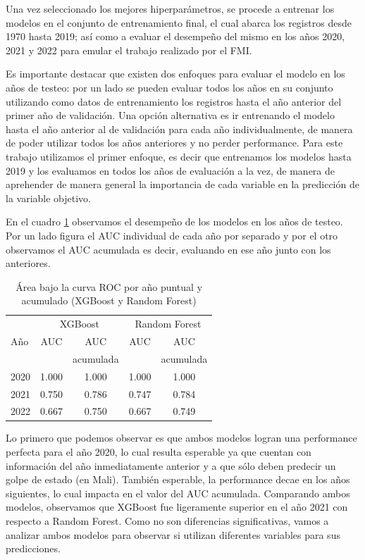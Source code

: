 \documentclass{article}
\begin{document}
Una vez seleccionado los mejores hiperparámetros, se procede a entrenar los modelos en el
conjunto de entrenamiento final, el cual abarca los registros desde 1970 hasta 2019; así
como a evaluar el desempeño del mismo en los años 2020, 2021 y 2022 para emular el trabajo
realizado por el FMI.

Es importante destacar que existen dos enfoques para evaluar el modelo en los años de
testeo: por un lado se pueden evaluar todos los años en su conjunto utilizando como datos
de entrenamiento los registros hasta el año anterior del primer año de validación. Una
opción alternativa es ir entrenando el modelo hasta el año anterior al de validación para
cada año individualmente, de manera de poder utilizar todos los años anteriores y no 
perder performance. Para este trabajo utilizamos el primer enfoque, es decir que entrenamos los 
modelos hasta 2019 y los evaluamos en todos los años de evaluación a la vez, de manera de
aprehender de manera general la importancia de cada variable en la predicción de la
variable objetivo.

En el cuadro \ref{tab:performance} observamos el desempeño de los modelos en los años
de testeo. Por un lado figura el AUC individual de cada año por separado y por el otro
observamos el AUC acumulada es decir, evaluando en ese año junto con los anteriores.

\begin{table}[H]
  \centering
    \begin{tabular}{lcccc}
      \toprule
      & \multicolumn{2}{c}{XGBoost} & \multicolumn{2}{c}{Random Forest} \\
      Año  & AUC      & AUC      & AUC      & AUC  \\
           &          & acumulada&          & acumulada \\
      \midrule
      2020 & 1.000 & 1.000 & 1.000 & 1.000 \\
      2021 & 0.750 & 0.786 & 0.747 & 0.784 \\
      2022 & 0.667 & 0.750 & 0.667 & 0.749 \\
      \bottomrule
    \end{tabular}
  \caption{Área bajo la curva ROC por año puntual y acumulado (XGBoost y 
  Random Forest) \label{tab:performance}}
\end{table}

Lo primero que podemos observar es que ambos modelos logran una performance perfecta 
para el año 2020, lo cual resulta esperable ya que cuentan con información del año 
inmediatamente anterior y a que sólo deben predecir un golpe de estado (en Mali).
También esperable, la performance decae en los años siguientes, 
lo cual impacta en el valor del AUC acumulada. Comparando ambos modelos, observamos
que XGBoost fue ligeramente superior en el año 2021 con respecto a Random Forest.
Como no son diferencias significativas, vamos a analizar ambos modelos para observar
si utilizan diferentes variables para sus predicciones.
\end{document}
